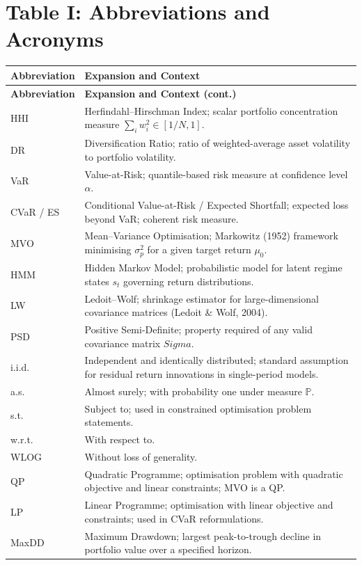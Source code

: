 \documentclass[12pt,openany]{book}
\newcommand{\Prob}{\mathbb{P}}
\newcommand{\bfSigma}{\boldsymbol{\Sigma}}
\numberwithin{equation}{chapter}
\theoremstyle{plain}
\theoremstyle{definition}
\theoremstyle{remark}
\def\bfSigma{Sigma}%
\begin{document}
\clearpage
\chapter*{Table I: Abbreviations and Acronyms}

{\small
\begin{longtable}{@{} p{3.0cm} p{\dimexpr\textwidth-3.0cm-2\tabcolsep\relax} @{}}
\hline
\textbf{Abbreviation} & \textbf{Expansion and Context} \\
\hline
\endfirsthead
\hline
\textbf{Abbreviation} & \textbf{Expansion and Context (cont.)} \\
\hline
\endhead
\endfoot
HHI & Herfindahl--Hirschman Index; scalar portfolio concentration
  measure $\sum_i w_i^2 \in [1/N, 1]$. \\
\addlinespace
DR & Diversification Ratio; ratio of weighted-average asset volatility
  to portfolio volatility. \\
\addlinespace
VaR & Value-at-Risk; quantile-based risk measure at confidence level
  $\alpha$. \\
\addlinespace
CVaR / ES & Conditional Value-at-Risk / Expected Shortfall; expected
  loss beyond VaR; coherent risk measure. \\
\addlinespace
MVO & Mean--Variance Optimisation; Markowitz (1952) framework
  minimising $\sigma_p^2$ for a given target return $\mu_0$. \\
\addlinespace
HMM & Hidden Markov Model; probabilistic model for latent regime
  states $s_t$ governing return distributions. \\
\addlinespace
LW & Ledoit--Wolf; shrinkage estimator for large-dimensional
  covariance matrices (Ledoit \& Wolf, 2004). \\
\addlinespace
PSD & Positive Semi-Definite; property required of any valid
  covariance matrix $\bfSigma$. \\
\addlinespace
i.i.d. & Independent and identically distributed; standard assumption
  for residual return innovations in single-period models. \\
\addlinespace
a.s. & Almost surely; with probability one under measure $\Prob$. \\
\addlinespace
s.t. & Subject to; used in constrained optimisation problem
  statements. \\
\addlinespace
w.r.t. & With respect to. \\
\addlinespace
WLOG & Without loss of generality. \\
\addlinespace
QP & Quadratic Programme; optimisation problem with quadratic
  objective and linear constraints; MVO is a QP. \\
\addlinespace
LP & Linear Programme; optimisation with linear objective and
  constraints; used in CVaR reformulations. \\
\addlinespace
MaxDD & Maximum Drawdown; largest peak-to-trough decline in portfolio
  value over a specified horizon. \\
\hline
\end{longtable}
}
\end{document}
